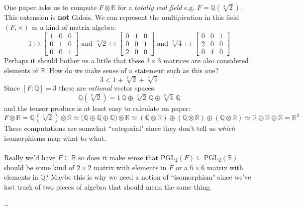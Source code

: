 \documentclass[12pt]{article}
\begin{document}
\noindent One paper asks us to compute $F \otimes \mathbb{R}$ for a \textit{totally real field} e.g. $F = \mathbb{Q}(\sqrt[3]{2})$.  This extension is \textbf{not} Galois. We can represent the multipication in this field $(F, \times)$ as a kind of matrix algebra:
$$ 1 \mapsto 
\left[ \begin{array}{ccc} 
1 & 0 & 0 \\
0 & 1 & 0 \\
0 & 0 & 1 \end{array} \right]
\text{ and }
\sqrt[3]{2} \mapsto 
\left[ \begin{array}{ccc} 
0 & 1 & 0 \\
0 & 0 & 1 \\
2 & 0 & 0 \end{array} \right]  \text{ and }
\sqrt[3]{4} \mapsto \left[ \begin{array}{ccc}  
0 & 0 & 1 \\ 2 & 0 & 0 \\ 0 & 4 & 0 \end{array}
\right] $$
Perhaps it should bother us a little that these $3 \times 3$ matrices are also considered elements of $\mathbb{R}$.  How do we make sense of a statement such as this one?
$$ 3 <  1 + \sqrt[3]{2} + \sqrt[3]{4}  $$
Since $[F:\mathbb{Q}]= 3$ these are \textit{rational} vector spaces:
$$ \mathbb{Q}(\sqrt[3]{2}) = 1 \, \mathbb{Q} \oplus \sqrt[3]{2} \, \mathbb{Q}\oplus \sqrt[3]{4} \, \mathbb{Q} $$
and the tensor produce is at least easy to calculate on paper:
$$ F \otimes \mathbb{R} 
= \mathbb{Q}(\sqrt[3]{2}) \otimes \mathbb{R}
\simeq \big( \mathbb{Q} \oplus \mathbb{Q} \oplus \mathbb{Q} \big) \otimes \mathbb{R}
\simeq (\mathbb{Q} \otimes \mathbb{R} ) \oplus (\mathbb{Q} \otimes \mathbb{R} ) \oplus  (\mathbb{Q} \otimes \mathbb{R} ) 
\simeq \mathbb{R} \oplus \mathbb{R} \oplus \mathbb{R} = \mathbb{R}^3 $$
These computations are somwhat ``categorial" since they don't tell us \textit{which} isomorphisms map what to what. \\ \\
Really we'd have $F \subseteq \mathbb{R}$ so does it make sense that $\text{PGL}_2(F)\subseteq \text{PGL}_2(\mathbb{R})$ should be some kind of $2 \times 2$ matrix with elements in $F$ or a $6 \times 6$ matrix with elements in $\mathbb{Q}$?  Maybe this is why we need a notion of ``isomorphism" since we've lost track of two pieces of algebra that should mean the same thing.  
\vfill

\begin{thebibliography}{}

\item \dots

\end{thebibliography}
\end{document}
